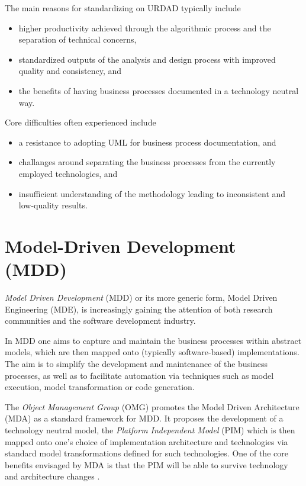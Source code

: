 \documentclass{IOS-Book-Article}
\begin{document}
The main reasons for standardizing on URDAD typically include
\begin{itemize}
  \item higher productivity achieved through the algorithmic process and the separation of technical concerns,
  \item standardized outputs of the analysis and design process with improved quality and consistency, and
  \item the benefits of having business processes documented in a technology neutral way.
\end{itemize}

Core difficulties often experienced include
\begin{itemize}
  \item a resistance to adopting UML for business process documentation, and
  \item challanges around separating the business processes from the currently employed technologies, and
  \item insufficient understanding of the methodology leading to inconsistent and low-quality results.
\end{itemize}


\section{Model-Driven Development (MDD)}


{\em Model Driven Development} (MDD) or its more generic form, Model Driven
Engineering (MDE),
\cite{selic:pragmaticsOfModelDrivenDevelopment,schmidt:modelDrivenEngineering, france:mddUsingUml2}
is increasingly gaining the attention of both research communities and the software development industry.

In MDD one aims to capture and maintain the business processes within abstract models,
which are then mapped onto (typically software-based) implementations. The
aim is to simplify the development and maintenance of the business processes,
as well as to facilitate automation via techniques such as model execution, model transformation 
or code generation.

The {\em Object Management Group} (OMG) promotes the Model Driven Architecture
(MDA) \cite{pastor:mdaInPractice,siegel:developingInMDA,frankel:enterpriseMDA,
stahl:mdsd}
as a standard framework for MDD. It proposes the development of a
technology neutral model, the {\em Platform Independent Model} (PIM) which is
then mapped onto one's choice of implementation architecture and technologies
via standard model transformations defined for such technologies. One of the
core benefits envisaged by MDA is that the PIM will be able to survive
technology and architecture changes \cite{siegel:developingInMDA}.
\end{document}
